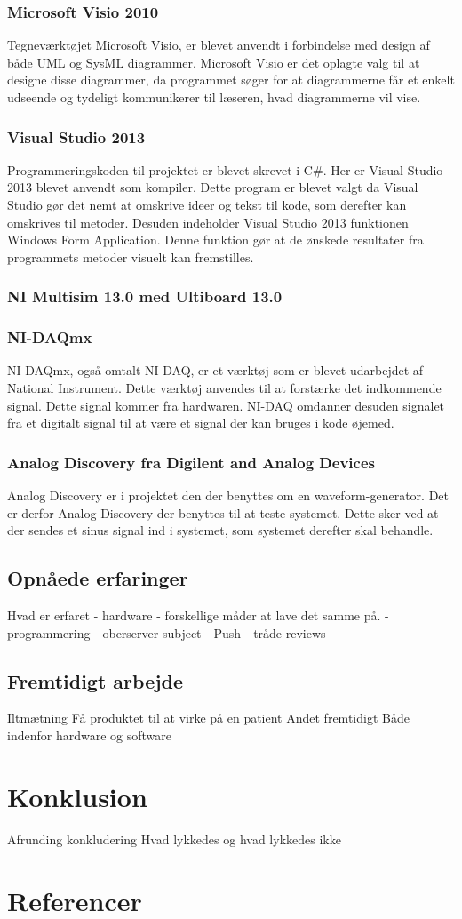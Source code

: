 \subsection{Microsoft Visio 2010}
Tegneværktøjet Microsoft Visio, er blevet anvendt i forbindelse med design af både UML og SysML diagrammer. Microsoft Visio er det oplagte valg til at designe disse diagrammer, da programmet søger for at diagrammerne får et enkelt udseende og tydeligt kommunikerer til læseren, hvad diagrammerne vil vise.
\subsection{Visual Studio 2013}
Programmeringskoden til projektet er blevet skrevet i C\#. Her er Visual Studio 2013 blevet anvendt som kompiler. Dette program er blevet valgt da Visual Studio gør det nemt at omskrive ideer og tekst til kode, som derefter kan omskrives til metoder. Desuden indeholder Visual Studio 2013 funktionen Windows Form Application. Denne funktion gør at de ønskede resultater fra programmets metoder visuelt kan fremstilles.
\subsection{NI Multisim 13.0 med Ultiboard 13.0}

\subsection{NI-DAQmx}
NI-DAQmx, også omtalt NI-DAQ, er et værktøj som er blevet udarbejdet af National Instrument. Dette værktøj anvendes til at forstærke det indkommende signal. Dette signal kommer fra hardwaren. NI-DAQ omdanner desuden signalet fra et digitalt signal til at være et signal der kan bruges i kode øjemed. 
\subsection{Analog Discovery fra Digilent and Analog Devices}
Analog Discovery er i projektet den der benyttes om en waveform-generator. Det er derfor Analog Discovery der benyttes til at teste systemet. Dette sker ved at der sendes et sinus signal ind i systemet, som systemet derefter skal behandle.
\section{Opnåede erfaringer}
Hvad er erfaret
 - hardware
 	- forskellige måder at lave det samme på.
 - programmering
 	- oberserver subject
 	- Push
 	- tråde
reviews
\section{Fremtidigt arbejde}
Iltmætning
Få produktet til at virke på en patient
Andet fremtidigt
Både indenfor hardware og software
\chapter{Konklusion}
Afrunding
konkludering
Hvad lykkedes og hvad lykkedes ikke
\chapter{Referencer}